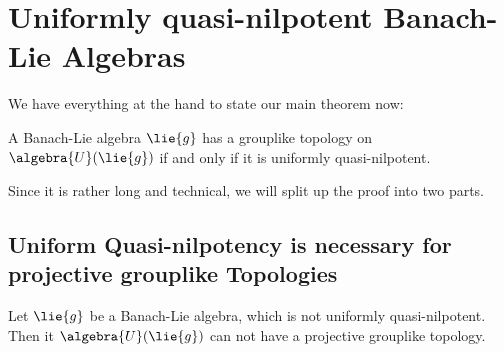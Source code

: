 \documentclass[
11pt,                          %
english                        %
]{article}
\begin{document}
\section{Uniformly quasi-nilpotent Banach-Lie Algebras}

We have everything at the hand to state our main theorem now:
\begin{theorem}
	\label{thm:main}
	A Banach-Lie algebra $\lie{g}$ has a grouplike topology on 
	$\algebra{U}(\lie{g})$ if and only if it is uniformly quasi-nilpotent.
\end{theorem}
Since it is rather long and technical, we will split up the proof into two parts.


\subsection{Uniform Quasi-nilpotency is necessary for projective grouplike 
Topologies}
\begin{proposition}
	\label{prop:mainthm_part_1}
	Let $\lie{g}$ be a Banach-Lie algebra, which is not uniformly 
	quasi-nilpotent. Then it $\algebra{U}(\lie{g})$ can not have a projective 
	grouplike topology.
\end{proposition}
\end{document}
